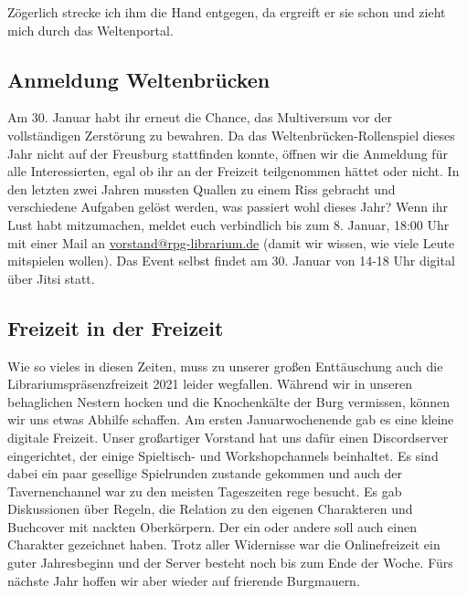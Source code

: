 \documentclass[final]{multiversum}
\begin{document}
Zögerlich strecke ich ihm die Hand entgegen, da ergreift er sie schon und zieht mich durch das Weltenportal.

\subsection{Anmeldung Weltenbrücken}
Am 30. Januar habt ihr erneut die Chance, das Multiversum vor der vollständigen Zerstörung zu bewahren. 
Da das Weltenbrücken-Rollenspiel dieses Jahr nicht auf der Freusburg stattfinden konnte, öffnen wir die Anmeldung für alle Interessierten, egal ob ihr an der Freizeit teilgenommen hättet oder nicht. 
In den letzten zwei Jahren mussten Quallen zu einem Riss gebracht und verschiedene Aufgaben gelöst werden, was passiert wohl dieses Jahr?
Wenn ihr Lust habt mitzumachen, meldet euch verbindlich bis zum 8. Januar, 18:00 Uhr mit einer Mail an \href{mailto:vorstand@rpg-librarium.de}{vorstand@rpg-librarium.de} (damit wir wissen, wie viele Leute mitspielen wollen).
Das Event selbst findet am 30. Januar von 14-18 Uhr digital über Jitsi statt.

\subsection{Freizeit in der Freizeit}
Wie so vieles in diesen Zeiten, muss zu unserer großen Enttäuschung auch die Librariumspräsenzfreizeit 2021 leider wegfallen.
Während wir in unseren behaglichen Nestern hocken und die Knochenkälte der Burg vermissen, können wir uns etwas Abhilfe schaffen.
Am ersten Januarwochenende gab es eine kleine digitale Freizeit.
Unser großartiger Vorstand hat uns dafür einen Discordserver eingerichtet, der einige Spieltisch- und Workshopchannels beinhaltet.
Es sind dabei ein paar gesellige Spielrunden zustande gekommen und auch der Tavernenchannel war zu den meisten Tageszeiten rege besucht.
Es gab Diskussionen über Regeln, die Relation zu den eigenen Charakteren und Buchcover mit nackten Oberkörpern.
Der ein oder andere soll auch einen Charakter gezeichnet haben.
Trotz aller Widernisse war die Onlinefreizeit ein guter Jahresbeginn und der Server besteht noch bis zum Ende der Woche.
Fürs nächste Jahr hoffen wir aber wieder auf frierende Burgmauern.
\end{document}

